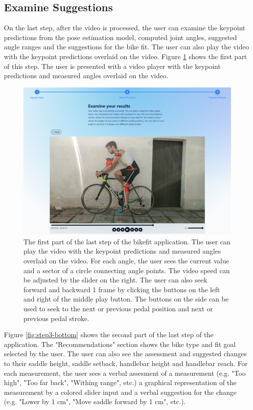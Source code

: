 \subsection{Examine Suggestions} On the last step, after the video is processed, the user can examine the keypoint predictions from the pose estimation model, computed joint angles, suggested angle ranges and the suggestions for the bike fit. The user can also play the video with the keypoint predictions overlaid on the video. Figure \ref{fig:step3-top} shows the first part of this step. The user is presented with a video player with the keypoint predictions and measured angles overlaid on the video.


\begin{figure}[htbp]
    \centering
    \includegraphics[width=\textwidth]{obrazky-figures/step3-top-crop.png}
    \caption{The first part of the last step of the bikefit application. The user can play the video with the keypoint predictions and measured angles overlaid on the video. For each angle, the user sees the current value and a sector of a circle connecting angle points. The video speed can be adjusted by the slider on the right. The user can also seek forward and backward 1 frame by clicking the buttons on the left and right of the middle play button. The buttons on the side can be used to seek to the next or previous pedal position and next or previous pedal stroke.}
    \label{fig:step3-top}
\end{figure}

Figure \ref{fig:step3-bottom} shows the second part of the last step of the application. The "Recommendations" section shows the bike type and fit goal selected by the user. The user can also see the assessment and suggested changes to their saddle height, saddle setback, handlebar height and handlebar reach. For each measurement, the user sees a verbal assesment of a measurement (e.g. "Too high", "Too far back", "Withing range", etc.) a graphical representation of the measurement by a colored slider input and a verbal suggestion for the change (e.g. "Lower by 1 cm", "Move saddle forward by 1 cm", etc.).

